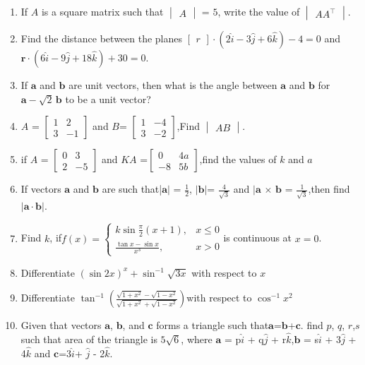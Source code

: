 \documentclass[12pt,-letter paper]{article}
\let\vec\mathbf{}
\let\vec\mathbf{}
\let\vec\mathbf{}
\providecommand{\mydet}[1]{\ensuremath{\begin{vmatrix}#1\end{vmatrix}}}
\providecommand{\myvec}[1]{\ensuremath{\begin{bmatrix}#1\end{bmatrix}}}
\providecommand{\brak}[1]{\ensuremath{\left(#1\right)}}
\begin{document}
\begin{enumerate}
	\item  If $A$ is a square matrix such that $\mydet{A}$ = $5$, write the value of $\mydet{AA^\top}$.
    \item  Find the distance between the planes $\myvec{r} \cdot \brak{2\hat{i} - 3\hat{j} + 6\hat{k}} - 4 = 0$ and $\vec{r} \cdot \brak{6\hat{i} - 9\hat{j} + 18\hat{k}} + 30 = 0$.

\item 
	If $\vec{a}$ and $\vec{b}$ are unit vectors, then what is the angle between $\vec{a}$ and $\vec{b}$ for $\vec{a} - \sqrt{2} \, \vec{b}$ to be a unit vector?

\item $ A $ = $\myvec{1 & 2 \\ 3 & -1}$ and $B$= $\myvec{1 & -4 \\ 3 & -2}$,Find  $\mydet{AB}$.

\item 	if $A$ = $\myvec{0 & 3 \\ 2 & -5 }$ and $KA$ =$\myvec{ 0 & 4a \\ -8 & 5b}$,find the values of $ k $ and $ a $

\item 
	If vectors $\vec{a}$ and $\vec{b}$ are such that|$\vec{a}|$ = $\frac{1}{2}$, $|\vec{b}| $= $\frac{4}{\sqrt{3}}$ and $|\vec{a}$ $\times$ $\vec{b}$ = $\frac{1}{\sqrt{3}}$,then find $|\vec{a} \cdot \vec{b}|$.
\item
	Find $ k $, if$ f(x) =\begin{cases} k \sin \frac{\pi}{2}(x+1), & x \leq 0 \\ \frac{\tan x - \sin x}{x^3}, & x > 0  \end{cases}$is continuous at $ x = 0 $.

\item

	Differentiate $\brak{\sin{2x}}^x + \sin^{-1}\sqrt{3x}$ with respect to $x$ 
\item 
	Differentiate $\tan^{-1}{\brak{\frac{\sqrt{1+x^2}-\sqrt{1-x^2}}{\sqrt{1+x^2}+\sqrt{1-x^2}}}}$with respect to $\cos^{-1}{x^2}$

\item
	Given that vectors $\vec{a}$, $\vec{b}$, and $\vec{c}$ forms a triangle such that$\vec{a}$=$\vec{b}$+$\vec{c}$. find $p$, $q$, $r$,$s$ such that area of the triangle is $5\sqrt{6}$, where $\vec{a}$ = p$\hat{i}$ + q$\hat{j}$ + r$\hat{k}$,$\vec{b}$ = s$\hat{i}$ + 3$\hat{j}$ + 4$\hat{k}$ and $\vec{c}$=3$\hat{i}$+ $\hat{j}$ - 2$\hat{k}$.


\end{enumerate}
\end{document}
